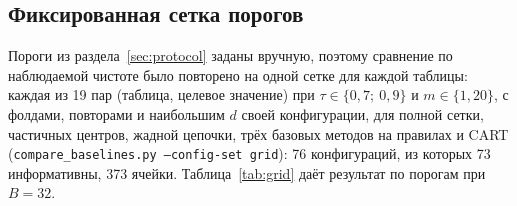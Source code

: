 \documentclass[11pt]{article}
\begin{document}
\subsection{Фиксированная сетка порогов}\label{sec:grid}
Пороги из раздела~\ref{sec:protocol} заданы вручную, поэтому сравнение по наблюдаемой чистоте было повторено на одной сетке для каждой таблицы: каждая из 19 пар (таблица, целевое значение) при $\tau\in\{0{,}7;\ 0{,}9\}$ и $m\in\{1,20\}$, с фолдами, повторами и наибольшим $d$ своей конфигурации, для полной сетки, частичных центров, жадной цепочки, трёх базовых методов на правилах и CART (\texttt{compare\_baselines.py --config-set grid}): 76 конфигураций, из которых 73 информативны, 373 ячейки. Таблица~\ref{tab:grid} даёт результат по порогам при $B=32$.

\begin{table}[t]\centering\small\setlength{\tabcolsep}{3.5pt}
\caption{Сравнение по наблюдаемой чистоте на одной фиксированной сетке порогов, $B=32$: число информативных конфигураций $n$; отметки ($|t|\ge2$) частичных центров (част.) и полной сетки против свободных непересекающихся правил (прав.); средние по конфигурациям покрытия и чистого покрытия на отложенных строках в пунктах и доли разбиений, в которых объединение на отложенных строках достигает $\tau$, для полной сетки, частичных центров и непересекающихся правил. Получено \texttt{experiments/paper\_tables.py} из \texttt{pairwise\_grid.csv}.}\label{tab:grid}

\end{table}
\end{document}
